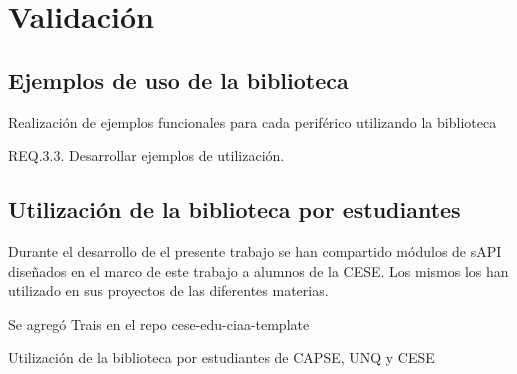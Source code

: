 \section{Validación}
\label{sec:validacion}



\subsection{Ejemplos de uso de la biblioteca}
\label{sec:libExamples}

Realización de ejemplos funcionales para cada periférico utilizando la biblioteca

REQ.3.3. Desarrollar ejemplos de utilización.
   
   



\subsection{Utilización de la biblioteca por estudiantes}
\label{sec:teach}

Durante el desarrollo de el presente trabajo se han compartido módulos de sAPI diseñados en el marco de este trabajo a alumnos de la CESE. Los mismos los han utilizado en sus proyectos de las diferentes materias.

Se agregó Trais en el repo cese-edu-ciaa-template

Utilización de la biblioteca por estudiantes de CAPSE, UNQ y CESE

